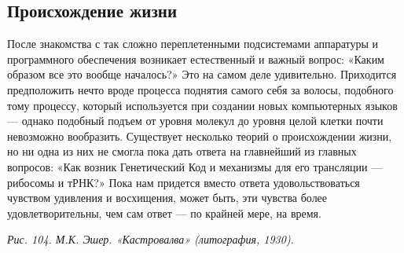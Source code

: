 \documentclass[../main.tex]{subfiles}
\begin{document}
\subsection{Происхождение жизни}

После знакомства с так сложно переплетенными подсистемами аппаратуры и программного обеспечения возникает естественный и важный вопрос: «Каким образом все это вообще началось?» Это на самом деле удивительно. Приходится предположить нечто вроде процесса поднятия самого себя за волосы, подобного тому процессу, который используется при создании новых компьютерных языков --- однако подобный подъем от уровня молекул до уровня целой клетки почти невозможно вообразить. Существует несколько теорий о происхождении жизни, но ни одна из них не смогла пока дать ответа на главнейший из главных вопросов: «Как возник Генетический Код и механизмы для его трансляции --- рибосомы и тРНК?» Пока нам придется вместо ответа удовольствоваться чувством удивления и восхищения, может быть, эти чувства более удовлетворительны, чем сам ответ --- по крайней мере, на время.

\emph{Рис. 104. М.К. Эшер. «Кастровалва» (литография, 1930).}
\end{document}
